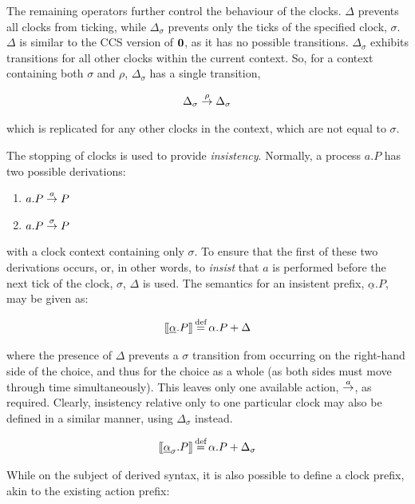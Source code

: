 The remaining operators further control the behaviour of the clocks.
$\Delta$ prevents all clocks from ticking, while $\Delta_{\sigma}$
prevents only the ticks of the specified clock, $\sigma$.  $\Delta$ is
similar to the CCS version of $\textbf{0}$, as it has no possible
transitions.  $\Delta_{\sigma}$ exhibits transitions for all other
clocks within the current context.  So, for a context containing both
$\sigma$ and $\rho$, $\Delta_{\sigma}$ has a single transition,

\begin{equation}
  \Delta_{\sigma} \stackrel{\rho}{\rightarrow} \Delta_{\sigma}
\end{equation}

\noindent which is replicated for any other clocks in the context,
which are not equal to $\sigma$.

The stopping of clocks is used to provide \emph{insistency}.  Normally,
a process $a.P$ has two possible derivations:

\begin{enumerate}
  \item $a.P \stackrel{a}{\rightarrow} P$
  \item $a.P \stackrel{\sigma}{\rightarrow} P$
\end{enumerate}

\noindent with a clock context containing only $\sigma$.  To ensure
that the first of these two derivations occurs, or, in other words, to
\emph{insist} that $a$ is performed before the next tick of the clock,
$\sigma$, $\Delta$ is used.  The semantics for an insistent prefix,
$\underline{\alpha}.P$, may be given as:

\begin{equation}
[\hspace{-0.3ex}[ \underline{\alpha}.P ]\hspace{-0.3ex}] \operatorname{\stackrel{\textrm{def}}{=}} \alpha.P + \Delta 
\end{equation}

\noindent where the presence of $\Delta$ prevents a $\sigma$
transition from occurring on the right-hand side of the choice, and
thus for the choice as a whole (as both sides must move through time
simultaneously).  This leaves only one available action,
$\stackrel{a}{\rightarrow}$, as required.  Clearly, insistency relative only to one
particular clock may also be defined in a similar manner, using
$\Delta_{\sigma}$ instead.

\begin{equation}
[\hspace{-0.3ex}[ \underline{\alpha}_{\sigma}.P ]\hspace{-0.3ex}] \operatorname{\stackrel{\textrm{def}}{=}} \alpha.P + \Delta_{\sigma} 
\end{equation}

While on the subject of derived syntax, it is also possible to define
a clock prefix, akin to the existing action prefix:

